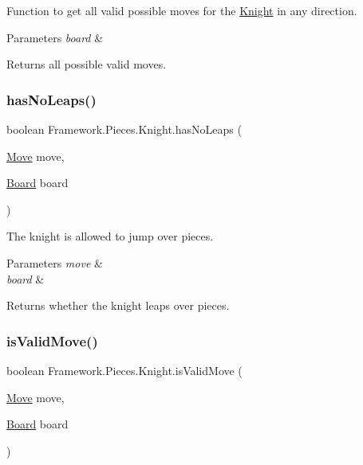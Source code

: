 Function to get all valid possible moves for the \hyperlink{class_framework_1_1_pieces_1_1_knight}{Knight} in any direction. 
\begin{DoxyParams}{Parameters}
{\em board} & \\
\hline
\end{DoxyParams}
\begin{DoxyReturn}{Returns}
all possible valid moves. 
\end{DoxyReturn}
\hypertarget{class_framework_1_1_pieces_1_1_knight_a7dd994749014c4f3f3d5f48c4701fd1b}{}\label{class_framework_1_1_pieces_1_1_knight_a7dd994749014c4f3f3d5f48c4701fd1b} 
\subsubsection{\texorpdfstring{has\+No\+Leaps()}{hasNoLeaps()}}
{\footnotesize\ttfamily boolean Framework.\+Pieces.\+Knight.\+has\+No\+Leaps (\begin{DoxyParamCaption}\item[{\hyperlink{class_framework_1_1_move}{Move}}]{move,  }\item[{\hyperlink{class_framework_1_1_board}{Board}}]{board }\end{DoxyParamCaption})}

The knight is allowed to jump over pieces. 
\begin{DoxyParams}{Parameters}
{\em move} & \\
\hline
{\em board} & \\
\hline
\end{DoxyParams}
\begin{DoxyReturn}{Returns}
whether the knight leaps over pieces. 
\end{DoxyReturn}
\hypertarget{class_framework_1_1_pieces_1_1_knight_ae483ea0bcaf3af8a6450532497165eb4}{}\label{class_framework_1_1_pieces_1_1_knight_ae483ea0bcaf3af8a6450532497165eb4} 
\subsubsection{\texorpdfstring{is\+Valid\+Move()}{isValidMove()}}
{\footnotesize\ttfamily boolean Framework.\+Pieces.\+Knight.\+is\+Valid\+Move (\begin{DoxyParamCaption}\item[{\hyperlink{class_framework_1_1_move}{Move}}]{move,  }\item[{\hyperlink{class_framework_1_1_board}{Board}}]{board }\end{DoxyParamCaption})}

